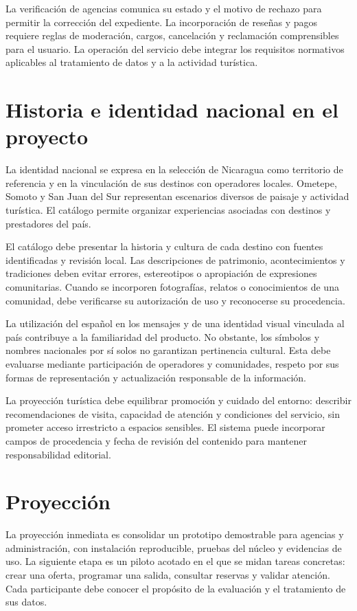 La verificación de agencias comunica su estado y el motivo de rechazo para permitir la corrección del expediente. La incorporación de reseñas y pagos requiere reglas de moderación, cargos, cancelación y reclamación comprensibles para el usuario. La operación del servicio debe integrar los requisitos normativos aplicables al tratamiento de datos y a la actividad turística.

\section{Historia e identidad nacional en el proyecto}
La identidad nacional se expresa en la selección de Nicaragua como territorio de referencia y en la vinculación de sus destinos con operadores locales. Ometepe, Somoto y San Juan del Sur representan escenarios diversos de paisaje y actividad turística. El catálogo permite organizar experiencias asociadas con destinos y prestadores del país.

El catálogo debe presentar la historia y cultura de cada destino con fuentes identificadas y revisión local. Las descripciones de patrimonio, acontecimientos y tradiciones deben evitar errores, estereotipos o apropiación de expresiones comunitarias. Cuando se incorporen fotografías, relatos o conocimientos de una comunidad, debe verificarse su autorización de uso y reconocerse su procedencia.

La utilización del español en los mensajes y de una identidad visual vinculada al país contribuye a la familiaridad del producto. No obstante, los símbolos y nombres nacionales por sí solos no garantizan pertinencia cultural. Esta debe evaluarse mediante participación de operadores y comunidades, respeto por sus formas de representación y actualización responsable de la información.

La proyección turística debe equilibrar promoción y cuidado del entorno: describir recomendaciones de visita, capacidad de atención y condiciones del servicio, sin prometer acceso irrestricto a espacios sensibles. El sistema puede incorporar campos de procedencia y fecha de revisión del contenido para mantener responsabilidad editorial.

\section{Proyección}
La proyección inmediata es consolidar un prototipo demostrable para agencias y administración, con instalación reproducible, pruebas del núcleo y evidencias de uso. La siguiente etapa es un piloto acotado en el que se midan tareas concretas: crear una oferta, programar una salida, consultar reservas y validar atención. Cada participante debe conocer el propósito de la evaluación y el tratamiento de sus datos.

